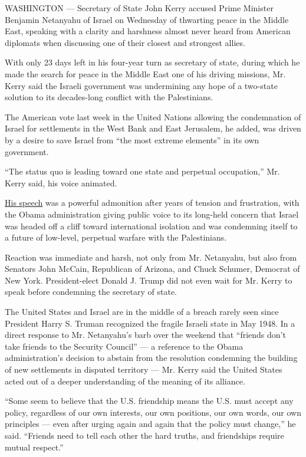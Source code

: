 WASHINGTON --- Secretary of State John Kerry accused Prime Minister
Benjamin Netanyahu of Israel on Wednesday of thwarting peace in the
Middle East, speaking with a clarity and harshness almost never heard
from American diplomats when discussing one of their closest and
strongest allies.

With only 23 days left in his four-year turn as secretary of state,
during which he made the search for peace in the Middle East one of his
driving missions, Mr. Kerry said the Israeli government was undermining
any hope of a two-state solution to its decades-long conflict with the
Palestinians.

The American vote last week in the United Nations allowing the
condemnation of Israel for settlements in the West Bank and East
Jerusalem, he added, was driven by a desire to save Israel from ``the
most extreme elements'' in its own government.

``The status quo is leading toward one state and perpetual occupation,''
Mr. Kerry said, his voice animated.

\href{https://www.state.gov/secretary/remarks/2016/12/266119.htm}{His
speech} was a powerful admonition after years of tension and
frustration, with the Obama administration giving public voice to its
long-held concern that Israel was headed off a cliff toward
international isolation and was condemning itself to a future of
low-level, perpetual warfare with the Palestinians.

Reaction was immediate and harsh, not only from Mr. Netanyahu, but also
from Senators John McCain, Republican of Arizona, and Chuck Schumer,
Democrat of New York. President-elect Donald J. Trump did not even wait
for Mr. Kerry to speak before condemning the secretary of state.

The United States and Israel are in the middle of a breach rarely seen
since President Harry S. Truman recognized the fragile Israeli state in
May 1948. In a direct response to Mr. Netanyahu's barb over the weekend
that ``friends don't take friends to the Security Council'' --- a
reference to the Obama administration's decision to abstain from the
resolution condemning the building of new settlements in disputed
territory --- Mr. Kerry said the United States acted out of a deeper
understanding of the meaning of its alliance.

``Some seem to believe that the U.S. friendship means the U.S. must
accept any policy, regardless of our own interests, our own positions,
our own words, our own principles --- even after urging again and again
that the policy must change,'' he said. ``Friends need to tell each
other the hard truths, and friendships require mutual respect.''

